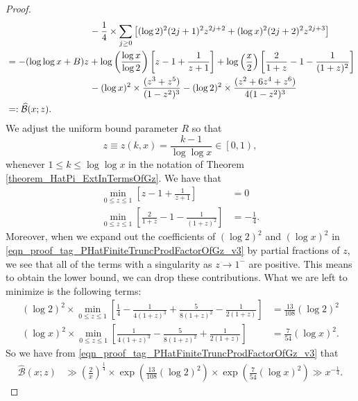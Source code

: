 \documentclass[11pt,reqno,a4letter]{article}
\numberwithin{figure}{section}
\numberwithin{table}{section}
\theoremstyle{plain}
\numberwithin{theorem}{section}
\theoremstyle{definition}
\begin{document}
\begin{proof}
\begin{align}
\notag 
     & \phantom{= -(B + \log\log x) z\ } - 
     \frac{1}{4} \times \sum_{j \geq 0} \left[ 
     (\log 2)^2 (2j+1)^2 z^{2j+2} + (\log x)^2 (2j+2)^2 z^{2j+3} 
     \right] \\ 
\notag 
     & = -(\log\log x + B) z + 
     \log\left(\frac{\log x}{\log 2}\right) \left[ 
     z - 1 + \frac{1}{z+1}\right] + 
     \log\left(\frac{x}{2}\right)\left[ 
     \frac{2}{1+z} - 1 - \frac{1}{(1+z)^2}\right] \\ 
\notag 
     & \phantom{= -(B + \log\log x) z\ } - 
     (\log x)^2 \times \frac{(z^3+z^5)}{(1-z^2)^3} - 
     (\log 2)^2 \times \frac{(z^2+6z^4+z^6)}{4 (1-z^2)^3} \\ 
\label{eqn_proof_tag_PHatFiniteTruncProdFactorOfGz_v3} 
     & =: \widehat{\mathcal{B}}(x; z). 
\end{align} 
We adjust the uniform bound parameter $R$ so that 
$$z \equiv z(k, x) = \frac{k-1}{\log\log x} \in \left[0, 1\right),$$ 
whenever $1 \leq k \leq \log\log x$ 
in the notation of Theorem \ref{theorem_HatPi_ExtInTermsOfGz}. 
We have that 
\begin{align*} 
\min_{0 \leq z \leq 1} \left[z - 1 + \frac{1}{z+1}\right] & = 0 \\ 
\min_{0 \leq z \leq 1} \left[\frac{2}{1+z} - 1 - \frac{1}{(1+z)^2}\right] & = -\frac{1}{4}. 
\end{align*} 
Moreover, when we expand out the coefficients of 
$(\log 2)^2$ and $(\log x)^2$ in 
\eqref{eqn_proof_tag_PHatFiniteTruncProdFactorOfGz_v3} 
by partial fractions of $z$, 
we see that all of the terms with a singularity as $z \rightarrow 1^{-}$ are positive. 
This means to obtain the lower bound, we can drop these contributions. 
What we are left to minimize is the following terms: 
\begin{align*} 
(\log 2)^2 \times \min_{0 \leq z \leq 1} \left[\frac{1}{4} - \frac{1}{4(1+z)^3} + 
     \frac{5}{8(1+z)^2} - \frac{1}{2(1+z)}\right] & = \frac{13}{108} (\log 2)^2 \\ 
(\log x)^2 \times \min_{0 \leq z \leq 1} \left[\frac{1}{4(1+z)^3} - 
     \frac{5}{8(1+z)^2} + \frac{1}{2(1+z)}\right] & = \frac{7}{54} (\log x)^2. 
\end{align*} 
So we have from \eqref{eqn_proof_tag_PHatFiniteTruncProdFactorOfGz_v3} that 
\begin{align*} 
\widehat{\mathcal{B}}(x; z) & \gg 
     \left(\frac{2}{x}\right)^{\frac{1}{4}} \times \exp\left( 
     \frac{13}{108} (\log 2)^2\right) \times \exp\left( 
     \frac{7}{54} (\log x)^2\right) \gg 
     x^{-\frac{1}{4}}. 
\end{align*} 

\end{proof}
\end{document}
